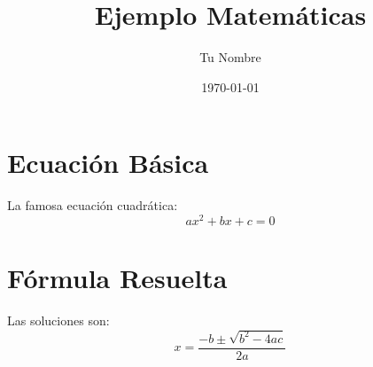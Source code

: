 \documentclass{article}
\begin{document}
\title{Ejemplo Matemáticas}
\author{Tu Nombre}
\date{\today}
\maketitle

\section{Ecuación Básica}

La famosa ecuación cuadrática:
\[
ax^2 + bx + c = 0
\]

\section{Fórmula Resuelta}

Las soluciones son:
\[
x = \frac{ -b \pm \sqrt{b^2 - 4ac} }{2a}
\]
\end{document}
